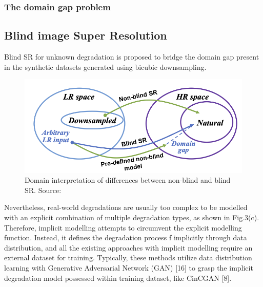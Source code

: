         
        \subsubsection{The domain gap problem}

    \subsection{Blind image Super Resolution}
    
        Blind SR for unknown degradation is proposed to bridge the domain gap present in the synthetic datasets generated using bicubic downsampling.
    

        \begin{figure}[h!]
            \centering
            \includegraphics[scale=0.45]{Includes/2-DomainGap.png}
            \caption{Domain interpretation of differences between non-blind and blind SR. Source: \cite{liu2021blind}}
            \label{fig:2-SR-ill-posed}
        \end{figure}

        Nevertheless, real-world degradations are usually too complex to be modelled with an explicit combination of multiple degradation types, as shown in Fig.3(c). Therefore, implicit modelling attempts to circumvent the explicit modelling function. Instead, it defines the degradation process f implicitly through data distribution, and all the existing approaches with implicit modelling require an external dataset for training. Typically, these methods utilize data distribution learning with Generative Adversarial Network (GAN) [16] to grasp the implicit degradation model possessed within training dataset, like CinCGAN [8].

\clearpage